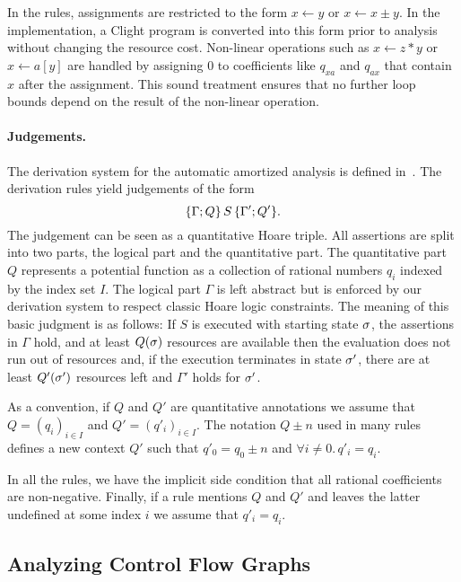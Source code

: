\documentclass[letterpaper,11pt]{article}
\newcommand{\pref}[1]{\prettyref{#1}}
\begin{document}
In the rules, assignments are restricted to the form $x \gets
y$ or $x \gets x \pm y$.  In the implementation, a Clight
program is converted into this form prior to analysis without changing
the resource cost.
Non-linear operations such as $x \gets z*y$ or $x \gets
a[y]$ are handled by assigning $0$ to coefficients
like $q_{xa}$ and $q_{ax}$ that contain $x$ after the assignment.
This sound treatment ensures that no further loop bounds
depend on the result of the non-linear operation.

\paragraph{Judgements.}

The derivation system for the automatic amortized analysis is defined
in~\pref{fig:auto}.  The derivation rules yield judgements of the form
$$
    \{ \Gamma; Q \}\,  S \, \{ \Gamma'; Q' \}.
$$
%
The judgement
can be seen as a quantitative Hoare triple.  All assertions are split into
two parts, the logical part and the quantitative part.  The
quantitative part $Q$ represents a potential function as a collection
of rational numbers $q_i$ indexed by the index set $I$.  The
logical part $\Gamma$ is left abstract but is enforced by our
derivation system to respect classic Hoare logic constraints.
%
The meaning of this basic judgment is as follows: If $S$ is executed
with starting state $\sigma$, the assertions in $\Gamma$
hold, and at least $Q(\sigma)$ resources are available then the
evaluation does not run out of resources and, if the execution
terminates in state $\sigma'$, there are at least $Q'(\sigma')$
resources left and $\Gamma'$ holds for $\sigma'$.


As a convention, if $Q$ and $Q'$ are quantitative annotations
we assume that $Q = (q_i)_{i\in I}$ and $Q' = (q'_i)_{i \in I}$.
The notation $Q \pm n$ used in many rules defines a new context $Q'$
such that $q'_0 = q_0 \pm n$ and $\forall i \neq 0 .\, q'_i = q_i$.

In all the rules, we have the implicit side condition that all rational
coefficients are non-negative.
%
Finally, if a rule mentions $Q$ and $Q'$
and leaves the latter undefined at some index $i$ we assume that $q'_i = q_i$.

\subsection{Analyzing Control Flow Graphs}
\end{document}
